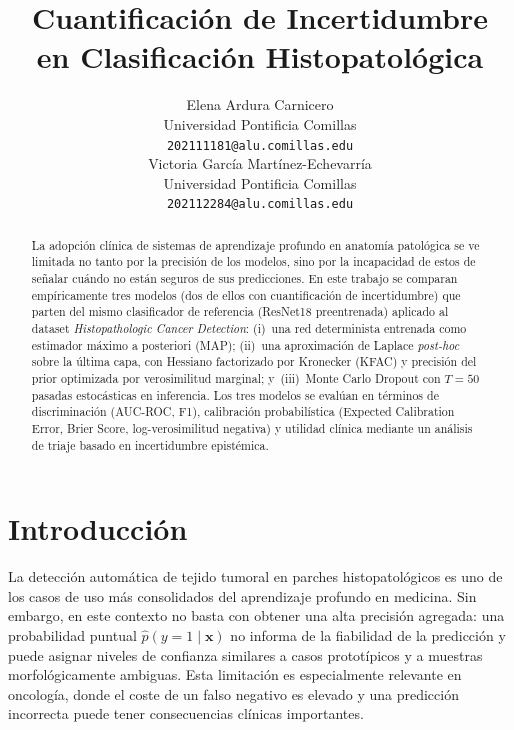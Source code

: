 \documentclass{article}
\title{Cuantificación de Incertidumbre \\ en Clasificación Histopatológica} %
\author{
  Elena Ardura Carnicero \\
  Universidad Pontificia Comillas\\
  \texttt{202111181@alu.comillas.edu} \\
  \And
  Victoria García Martínez-Echevarría \\
  Universidad Pontificia Comillas\\
  \texttt{202112284@alu.comillas.edu} \\
}
\begin{document}
\maketitle


\begin{abstract}
    La adopción clínica de sistemas de aprendizaje profundo en anatomía patológica se ve 
    limitada no tanto por la precisión de los modelos, sino por la incapacidad de estos de señalar cuándo no están seguros de sus predicciones. 
    En este trabajo se comparan empíricamente tres modelos (dos de ellos con cuantificación de incertidumbre) que parten del mismo clasificador de referencia
    (ResNet18 preentrenada) aplicado al dataset \emph{Histopathologic Cancer Detection}:
    (i)~una red determinista entrenada como estimador m\'aximo a posteriori (MAP);
    (ii)~una aproximaci\'on de Laplace \emph{post-hoc} sobre la \'ultima
    capa, con Hessiano factorizado por Kronecker (KFAC) y precisi\'on del
    prior optimizada por verosimilitud marginal;
    y~(iii)~Monte Carlo Dropout con $T{=}50$ pasadas estoc\'asticas en inferencia.
    Los tres modelos se eval\'uan en términos de discriminación (AUC-ROC, F1), 
    calibración probabilística (Expected Calibration Error, Brier Score, log-verosimilitud negativa) y 
    utilidad clínica mediante un análisis de triaje basado en incertidumbre epistémica.

\end{abstract}


\section{Introducci\'on}
\label{sec:intro}

La detecci\'on autom\'atica de tejido tumoral en parches histopatol\'ogicos
es uno de los casos de uso m\'as consolidados del aprendizaje profundo en
medicina. Sin embargo, en este contexto no basta con obtener una alta
precisi\'on agregada: una probabilidad puntual
$\hat p(y=1\mid \mathbf{x})$ no informa de la fiabilidad de la
predicci\'on y puede asignar niveles de confianza similares a casos
protot\'ipicos y a muestras morfol\'ogicamente ambiguas. Esta limitaci\'on
es especialmente relevante en oncolog\'ia, donde el coste de un falso
negativo es elevado y una predicci\'on incorrecta puede tener consecuencias
cl\'inicas importantes.
\end{document}
